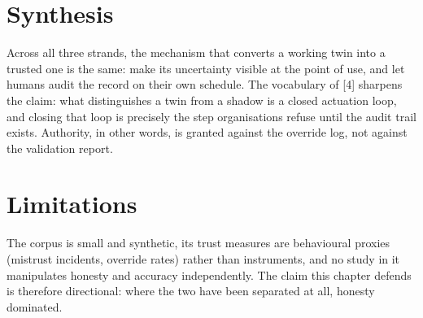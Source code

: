\section{Synthesis}\label{sec:trust-synthesis}

Across all three strands, the mechanism that converts a working twin
into a trusted one is the same: make its uncertainty visible at the
point of use, and let humans audit the record on their own schedule. The
vocabulary of {[}4{]} sharpens the claim: what distinguishes a twin from
a shadow is a closed actuation loop, and closing that loop is precisely
the step organisations refuse until the audit trail exists. Authority,
in other words, is granted against the override log, not against the
validation report.

\section{Limitations}\label{sec:trust-limitations}

The corpus is small and synthetic, its trust measures are behavioural
proxies (mistrust incidents, override rates) rather than instruments,
and no study in it manipulates honesty and accuracy independently. The
claim this chapter defends is therefore directional: where the two have
been separated at all, honesty dominated.

\label{refs}
\begin{CSLReferences}{0}{0}
\CSLLeftMargin{{[}1{]} }%

\CSLLeftMargin{{[}2{]} }%

\CSLLeftMargin{{[}3{]} }%

\CSLLeftMargin{{[}4{]} }%

\end{CSLReferences}
